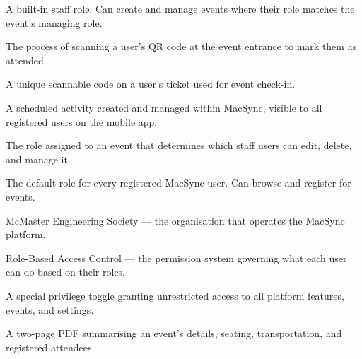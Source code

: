 \documentclass[12pt, twoside]{report}
\begin{document}
\begin{description}[leftmargin=3.5cm, style=sameline]
  \item[Admin]         A built-in staff role. Can create and manage events
                       where their role matches the event's managing role.
  \item[Check-in]      The process of scanning a user's QR code at the
                       event entrance to mark them as attended.
  \item[Entry QR Code] A unique scannable code on a user's ticket used for
                       event check-in.
  \item[Event]         A scheduled activity created and managed within MacSync,
                       visible to all registered users on the mobile app.
  \item[Managing Role] The role assigned to an event that determines which
                       staff users can edit, delete, and manage it.
  \item[Member]        The default role for every registered MacSync user.
                       Can browse and register for events.
  \item[MES]           McMaster Engineering Society --- the organisation that
                       operates the MacSync platform.
  \item[RBAC]          Role-Based Access Control --- the permission system
                       governing what each user can do based on their roles.
  \item[System Admin]  A special privilege toggle granting unrestricted access
                       to all platform features, events, and settings.
  \item[Venue Report]  A two-page PDF summarising an event's details, seating,
                       transportation, and registered attendees.
\end{description}
\end{document}
